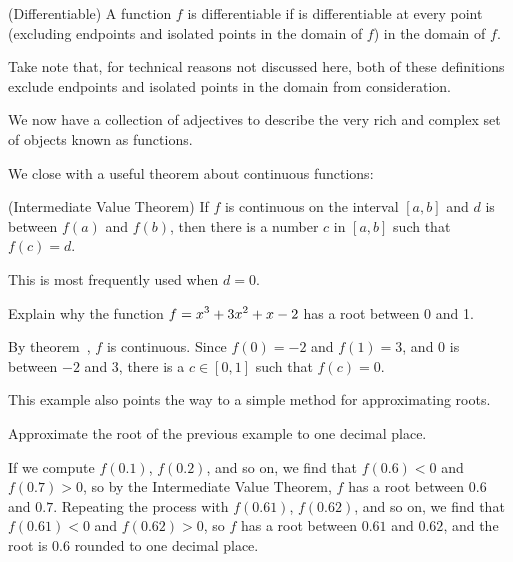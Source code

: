 \begin{definition} (Differentiable) A function $f$ is differentiable if is
differentiable at every point (excluding endpoints and isolated points in the
domain of $f$) in the domain of $f$.
\end{definition}

Take note that, for technical reasons not discussed here, both of these
definitions exclude endpoints and isolated points in the domain from
consideration.

We now have a collection of adjectives to describe the very rich and
complex set of objects known as functions.

We close with a useful theorem about continuous functions:

\begin{theorem} (Intermediate Value Theorem) If $f$ is continuous on the interval
$[a,b]$ and $d$ is between $f(a)$ and $f(b)$, then there is a number
$c$ in $[a,b]$ such that $f(c)=d$. 
\end{theorem}
\label{thm:intermediate value theorem}

This is most frequently used when $d=0$.

\begin{example} Explain why the function $\displaystyle f=x^3 + 3x^2+x-2$ has a root between 0
and 1.

By theorem~, $f$ is continuous.
Since $f(0)=-2$ and $f(1)=3$, and $0$ is between $-2$ and $3$, there
is a $c\in[0,1]$ such that $f(c)=0$.
\end{example}

This example also points the way to a simple method for approximating
roots. 

\begin{example} Approximate the root of the previous example  to one decimal
place.

If we compute $f(0.1)$, $f(0.2)$, and so on, we find that 
$f(0.6)<0$ and $f(0.7)>0$, so by the Intermediate Value Theorem, $f$
has a root between $0.6$ and $0.7$. Repeating the process with
$f(0.61)$, $f(0.62)$, and so on, we find that
$f(0.61)<0$ and $f(0.62)>0$, so $f$ has a root between
$0.61$ and $0.62$, and the root is $0.6$ rounded to one decimal place.
\end{example}

